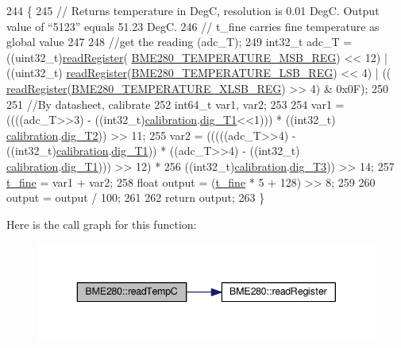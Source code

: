 \begin{DoxyCode}
244 \{
245     \textcolor{comment}{// Returns temperature in DegC, resolution is 0.01 DegC. Output value of “5123” equals 51.23 DegC.}
246     \textcolor{comment}{// t\_fine carries fine temperature as global value}
247 
248     \textcolor{comment}{//get the reading (adc\_T);}
249     int32\_t adc\_T = ((uint32\_t)\hyperlink{class_b_m_e280_a1bbd14c8591966df531e40085342ff71}{readRegister}(
      \hyperlink{_cool_spark_fun_b_m_e280_8h_a274a08bbc75e1b359aa6c46b50954b33}{BME280\_TEMPERATURE\_MSB\_REG}) << 12) | ((uint32\_t)
      \hyperlink{class_b_m_e280_a1bbd14c8591966df531e40085342ff71}{readRegister}(\hyperlink{_cool_spark_fun_b_m_e280_8h_ab54b428fbb78e70606ce994fcbfbc6aa}{BME280\_TEMPERATURE\_LSB\_REG}) << 4) | ((
      \hyperlink{class_b_m_e280_a1bbd14c8591966df531e40085342ff71}{readRegister}(\hyperlink{_cool_spark_fun_b_m_e280_8h_a1376db91beb753a83dbbd8f1d0716a56}{BME280\_TEMPERATURE\_XLSB\_REG}) >> 4) & 0x0F);
250 
251     \textcolor{comment}{//By datasheet, calibrate}
252     int64\_t var1, var2;
253 
254     var1 = ((((adc\_T>>3) - ((int32\_t)\hyperlink{class_b_m_e280_aa7a28484b6f5eb6f43261ea25016fbf8}{calibration}.\hyperlink{struct_sensor_calibration_a044a8c40e958b1cda3fb85b95303550e}{dig\_T1}<<1))) * ((int32\_t)
      \hyperlink{class_b_m_e280_aa7a28484b6f5eb6f43261ea25016fbf8}{calibration}.\hyperlink{struct_sensor_calibration_a8f8bb62e10c9bc0decb4463128ccaee5}{dig\_T2})) >> 11;
255     var2 = (((((adc\_T>>4) - ((int32\_t)\hyperlink{class_b_m_e280_aa7a28484b6f5eb6f43261ea25016fbf8}{calibration}.\hyperlink{struct_sensor_calibration_a044a8c40e958b1cda3fb85b95303550e}{dig\_T1})) * ((adc\_T>>4) - ((int32\_t)
      \hyperlink{class_b_m_e280_aa7a28484b6f5eb6f43261ea25016fbf8}{calibration}.\hyperlink{struct_sensor_calibration_a044a8c40e958b1cda3fb85b95303550e}{dig\_T1}))) >> 12) *
256     ((int32\_t)\hyperlink{class_b_m_e280_aa7a28484b6f5eb6f43261ea25016fbf8}{calibration}.\hyperlink{struct_sensor_calibration_a5b134db1776888487855c6b526d130d6}{dig\_T3})) >> 14;
257     \hyperlink{class_b_m_e280_ad20f44914b78395f4d4bc64f4a68b369}{t\_fine} = var1 + var2;
258     \textcolor{keywordtype}{float} output = (\hyperlink{class_b_m_e280_ad20f44914b78395f4d4bc64f4a68b369}{t\_fine} * 5 + 128) >> 8;
259 
260     output = output / 100;
261     
262     \textcolor{keywordflow}{return} output;
263 \}
\end{DoxyCode}
Here is the call graph for this function\+:\nopagebreak
\begin{figure}[H]
\begin{center}
\leavevmode
\includegraphics[width=343pt]{df/dcf/class_b_m_e280_afffdd1d7ded9e1f92200e70669019d97_cgraph}
\end{center}
\end{figure}
